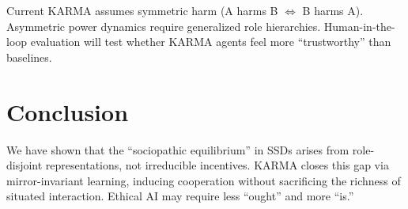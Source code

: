 \documentclass[11pt]{article}
\begin{document}
Current KARMA assumes symmetric harm (A harms B $\Leftrightarrow$ B harms A). Asymmetric power dynamics require generalized role hierarchies. Human-in-the-loop evaluation will test whether KARMA agents feel more ``trustworthy'' than baselines.

\section{Conclusion}

We have shown that the ``sociopathic equilibrium'' in SSDs arises from role-disjoint representations, not irreducible incentives. KARMA closes this gap via mirror-invariant learning, inducing cooperation without sacrificing the richness of situated interaction. Ethical AI may require less ``ought'' and more ``is.''


\end{document}
